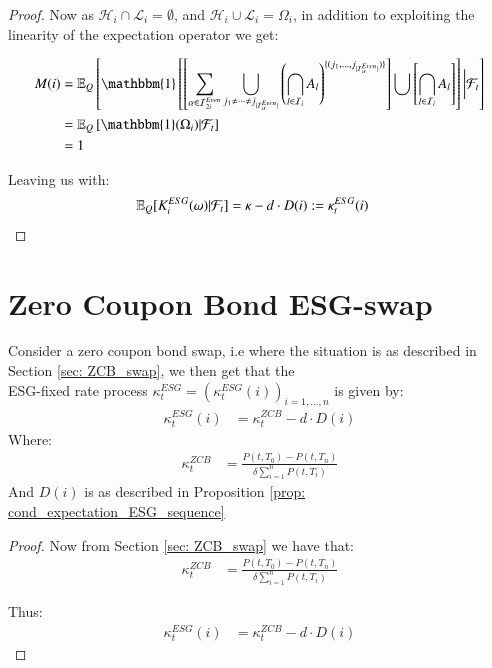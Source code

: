 \begin{proof}
Now as $\mathcal{H}_{i}\cap \mathcal{L}_{i} = \emptyset$, 
and $\mathcal{H}_{i}\cup \mathcal{L}_{i} = \Omega_{i}$, in addition to exploiting the linearity of the expectation operator we get:

\begin{align*}
M(i) 
&= 
\E_{Q}\left[
\mathbbm{1}\left[
\left[
\sum_{\alpha \in \mathcal{I}_{2i}^{Even}}
\bigcup_{
j_{1} \neq \dots \neq j_{|\mathcal{I}_{\alpha}^{Even}|}
}
\left(
\bigcap_{l \in \mathcal{I}_{i}}A_{l}
\right)^{
\{
(j_{1}, \dots, j_{|\mathcal{I}_{\alpha}^{Even}|})
\}
}
\right]
\bigcup
\left[
\bigcap_{l \in \mathcal{I}_{i}}A_{l}
\right]
\right]
\bigg{|}\F_{t}
\right] \\ 
&= 
\E_{Q}\left[
\mathbbm{1}(\Omega_{i})|\F_{t}
\right] \\ 
&= 
1
\end{align*}

Leaving us with: 
\begin{align*}
\mathbb{E}_{Q}[K_{i}^{ESG}(\omega)|\mathcal{F}_{t}] &= 
\kappa - d\cdot D(i) := \kappa_{t}^{ESG}(i)
\end{align*}


\end{proof}


\section{Zero Coupon Bond ESG-swap}

\begin{proposition}
Consider a zero coupon bond swap, i.e where the situation is as described in Section \cref{sec: ZCB_swap}, we then get that the
\\ 
ESG-fixed rate process $\kappa^{ESG}_{t} = (\kappa_{t}^{ESG}(i))_{i=1, \dots, n}$ is given by: 
\begin{align*}
\kappa_{t}^{ESG}(i) &= \kappa_{t}^{ZCB} -d\cdot D(i)    
\end{align*}
Where: 
\begin{align*}
\kappa_{t}^{ZCB} &=  
\frac{
P(t,T_{0}) - P(t,T_{n})
}{
\delta\sum_{i=1}^{n}P(t,T_{i})
}
\end{align*}
And $D(i)$ is as described in Proposition \ref{prop: cond_expectation_ESG_sequence}

\end{proposition}

\begin{proof}
Now from Section \cref{sec: ZCB_swap} we have that: 
\begin{align*}
\kappa_{t}^{ZCB} &=  
\frac{
P(t,T_{0}) - P(t,T_{n})
}{
\delta\sum_{i=1}^{n}P(t,T_{i})
}    
\end{align*}

Thus: 
\begin{align*}
\kappa_{t}^{ESG}(i) &= \kappa_{t}^{ZCB} -d\cdot D(i)    
\end{align*}
\end{proof}



